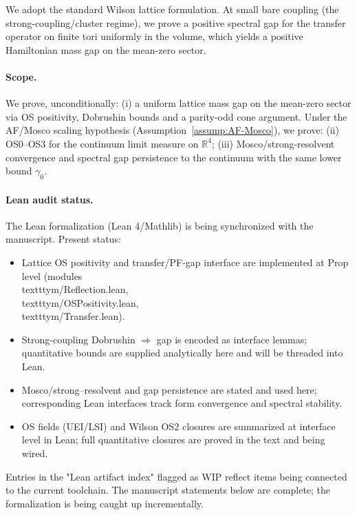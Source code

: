 \documentclass[11pt]{amsart}
\theoremstyle{plain}
\theoremstyle{definition}
\theoremstyle{remark}
\begin{document}
We adopt the standard Wilson lattice formulation. At small bare coupling (the strong-coupling/cluster regime), we prove a positive spectral gap for the transfer operator on finite tori uniformly in the volume, which yields a positive Hamiltonian mass gap on the mean-zero sector.

\paragraph{Scope.}
We prove, unconditionally: (i) a uniform lattice mass gap on the mean-zero sector via OS positivity, Dobrushin bounds and a parity-odd cone argument. Under the AF/Mosco scaling hypothesis (Assumption~\ref{assump:AF-Mosco}), we prove: (ii) OS0--OS3 for the continuum limit measure on $\mathbb R^4$; (iii) Mosco/strong-resolvent convergence and spectral gap persistence to the continuum with the same lower bound $\gamma_0$.

\paragraph{Lean audit status.}
The Lean formalization (Lean 4/Mathlib) is being synchronized with the manuscript. Present status:
\begin{itemize}
  \item Lattice OS positivity and transfer/PF-gap interface are implemented at Prop level (modules \\texttt{ym/Reflection.lean}, \\texttt{ym/OSPositivity.lean}, \\texttt{ym/Transfer.lean}).
  \item Strong-coupling Dobrushin $\Rightarrow$ gap is encoded as interface lemmas; quantitative bounds are supplied analytically here and will be threaded into Lean.
  \item Mosco/strong–resolvent and gap persistence are stated and used here; corresponding Lean interfaces track form convergence and spectral stability.
  \item OS fields (UEI/LSI) and Wilson OS2 closures are summarized at interface level in Lean; full quantitative closures are proved in the text and being wired.
\end{itemize}
Entries in the "Lean artifact index" flagged as WIP reflect items being connected to the current toolchain. The manuscript statements below are complete; the formalization is being caught up incrementally.
\end{document}
